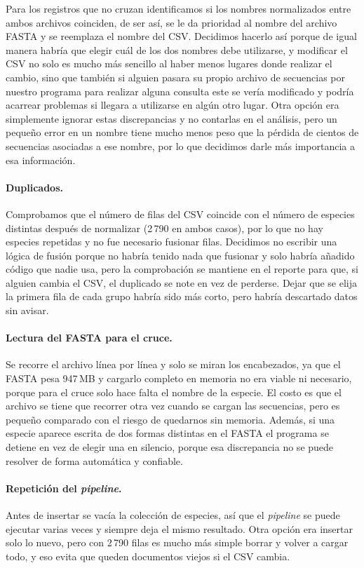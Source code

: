 Para los registros que no cruzan identificamos si los nombres normalizados
entre ambos archivos coinciden, de ser así, se le da prioridad al nombre del
archivo FASTA y se reemplaza el nombre del CSV. Decidimos hacerlo así porque
de igual manera habría que elegir cuál de los dos nombres debe utilizarse, y
modificar el CSV no solo es mucho más sencillo al haber menos lugares donde
realizar el cambio, sino que también si alguien pasara su propio archivo de
secuencias por nuestro programa para realizar alguna consulta este se vería
modificado y podría acarrear problemas si llegara a utilizarse en algún otro
lugar. Otra opción era simplemente ignorar estas discrepancias y no
contarlas en el análisis, pero un pequeño error en un nombre tiene mucho
menos peso que la pérdida de cientos de secuencias asociadas a ese nombre,
por lo que decidimos darle más importancia a esa información.

\paragraph{Duplicados.}
Comprobamos que el número de filas del CSV coincide con el número de
especies distintas después de normalizar (2\,790 en ambos casos), por lo que
no hay especies repetidas y no fue necesario fusionar filas. Decidimos no
escribir una lógica de fusión porque no habría tenido nada que fusionar y
solo habría añadido código que nadie usa, pero la comprobación se mantiene
en el reporte para que, si alguien cambia el CSV, el duplicado se note en
vez de perderse. Dejar que se elija la primera fila de cada grupo habría
sido más corto, pero habría descartado datos sin avisar.

\paragraph{Lectura del FASTA para el cruce.}
Se recorre el archivo línea por línea y solo se miran los encabezados, ya
que el FASTA pesa 947\,MB y cargarlo completo en memoria no era viable ni
necesario, porque para el cruce solo hace falta el nombre de la especie. El
costo es que el archivo se tiene que recorrer otra vez cuando se cargan las
secuencias, pero es pequeño comparado con el riesgo de quedarnos sin
memoria. Además, si una especie aparece escrita de dos formas distintas en
el FASTA el programa se detiene en vez de elegir una en silencio, porque esa
discrepancia no se puede resolver de forma automática y confiable.

\paragraph{Repetición del \textit{pipeline}.}
Antes de insertar se vacía la colección de especies, así que el
\textit{pipeline} se puede ejecutar varias veces y siempre deja el mismo
resultado. Otra opción era insertar solo lo nuevo, pero con 2\,790 filas es
mucho más simple borrar y volver a cargar todo, y eso evita que queden
documentos viejos si el CSV cambia.

